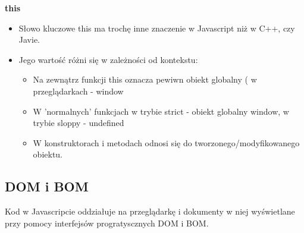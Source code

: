 \documentclass[../main.tex]{subfiles}
\begin{document}
    \textbf{this}
    \begin{itemize}
        \item Słowo kluczowe this ma trochę inne znaczenie w Javascript niż w C++, czy Javie.
        \item Jego wartość różni się w zależności od kontekstu:
        \begin{itemize}
            \item Na zewnątrz funkcji this oznacza pewiwn obiekt globalny ( w przeglądarkach - window
            \item W 'normalnych' funkcjach w trybie strict - obiekt globalny window, w trybie sloppy - undefined
            \item W konstruktorach i metodach odnosi się do tworzonego/modyfikowanego obiektu.
        \end{itemize}
    \end{itemize}


    \subsection{DOM i BOM}
    Kod w Javascripcie oddziałuje na przeglądarkę i dokumenty w niej wyświetlane przy pomocy interfejsów progratyscznych DOM i BOM.
\end{document}
